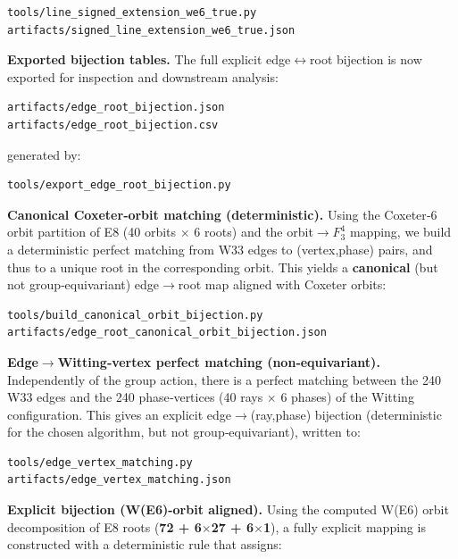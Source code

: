 \documentclass[11pt]{article}
\begin{document}
\begin{verbatim}
tools/line_signed_extension_we6_true.py
artifacts/signed_line_extension_we6_true.json
\end{verbatim}

\textbf{Exported bijection tables.} The full explicit
edge\ensuremath{\leftrightarrow}root bijection is now exported for
inspection and downstream analysis:

\begin{verbatim}
artifacts/edge_root_bijection.json
artifacts/edge_root_bijection.csv
\end{verbatim}

generated by:

\begin{verbatim}
tools/export_edge_root_bijection.py
\end{verbatim}

\textbf{Canonical Coxeter‑orbit matching (deterministic).} Using the
Coxeter‑6 orbit partition of E8 (40 orbits \ensuremath{\times} 6 roots)
and the orbit\ensuremath{\rightarrow}\(F_{3}^{4}\) mapping, we build a
deterministic perfect matching from W33 edges to (vertex,phase) pairs,
and thus to a unique root in the corresponding orbit. This yields a
\textbf{canonical} (but not group‑equivariant)
edge\ensuremath{\rightarrow}root map aligned with Coxeter orbits:

\begin{verbatim}
tools/build_canonical_orbit_bijection.py
artifacts/edge_root_canonical_orbit_bijection.json
\end{verbatim}

\textbf{Edge\ensuremath{\rightarrow}Witting‑vertex perfect matching
(non‑equivariant).} Independently of the group action, there is a
perfect matching between the 240 W33 edges and the 240 phase‑vertices
(40 rays \ensuremath{\times} 6 phases) of the Witting configuration.
This gives an explicit edge\ensuremath{\rightarrow}(ray,phase) bijection
(deterministic for the chosen algorithm, but not group‑equivariant),
written to:

\begin{verbatim}
tools/edge_vertex_matching.py
artifacts/edge_vertex_matching.json
\end{verbatim}

\textbf{Explicit bijection (W(E6)-orbit aligned).} Using the computed
W(E6) orbit decomposition of E8 roots (\textbf{72 +
6\ensuremath{\times}27 + 6\ensuremath{\times}1}), a fully explicit
mapping is constructed with a deterministic rule that assigns:
\end{document}
